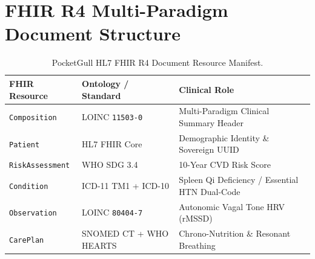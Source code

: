 \documentclass[11pt,a4paper]{article}
\begin{document}
\section{FHIR R4 Multi-Paradigm Document Structure}
\begin{table}[h!]
\centering
\small
\begin{tabular}{lll}
\toprule
\textbf{FHIR Resource} & \textbf{Ontology / Standard} & \textbf{Clinical Role} \\
\midrule
\texttt{Composition} & LOINC \texttt{11503-0} & Multi-Paradigm Clinical Summary Header \\
\texttt{Patient} & HL7 FHIR Core & Demographic Identity \& Sovereign UUID \\
\texttt{RiskAssessment} & WHO SDG 3.4 & 10-Year CVD Risk Score \\
\texttt{Condition} & ICD-11 TM1 + ICD-10 & Spleen Qi Deficiency / Essential HTN Dual-Code \\
\texttt{Observation} & LOINC \texttt{80404-7} & Autonomic Vagal Tone HRV (rMSSD) \\
\texttt{CarePlan} & SNOMED CT + WHO HEARTS & Chrono-Nutrition \& Resonant Breathing \\
\bottomrule
\end{tabular}
\caption{PocketGull HL7 FHIR R4 Document Resource Manifest.}
\end{table}
\end{document}

